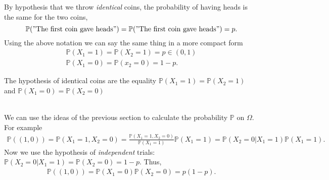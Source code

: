 \documentclass[12pt]{article}
\newcommand{\<}{{\langle \!\! \langle}}
\renewcommand{\>}{{\rangle \!\! \rangle}}
\newcommand{\bel}[2]{\begin{equation} \label{#1} \begin{split} #2
 					\end{split} \end{equation}}
\newcommand{\commento}[1]{
	\par\noindent
	\colorbox{light}{\begin{minipage}{120 mm}#1\end{minipage}}
	\par\noindent
}
\begin{document}
By hypothesis that we throw \emph{identical} coins, the probability of having heads is the same for the two coins, 
$$\mathbb{P}("\textrm{The first coin gave heads}")=\mathbb{P}("\textrm{The first coin gave heads}")=p.$$
Using the above notation we can say the same thing in a more compact form 
\bel{}{\mathbb{P}(X_1=1)=\mathbb{P}(X_2=1)=p\in(0,1)\\
\mathbb{P}(X_1=0)=\mathbb{P}(x_2=0)=1-p.}
\commento{The hypothesis of identical coins are the equality $\mathbb{P}(X_1=1)=\mathbb{P}(X_2=1)$ and $\mathbb{P}(X_1=0)=\mathbb{P}(X_2=0)$}\\
We can use the ideas of the previous section to calculate the probability $\mathbb{P}$ on $\Omega$. For example 
\bel{}{\mathbb{P}((1,0))=\mathbb{P}(X_1=1,X_2=0)=\frac{\mathbb{P}(X_1=1,X_2=0)}{\mathbb{P}(X_1=1)}\mathbb{P}(X_1=1)=\mathbb{P}(X_2=0|X_1=1)\mathbb{P}(X_1=1).}
Now we use the hypothesis of \emph{independent} trials: $\mathbb{P}(X_2=0|X_1=1)=\mathbb{P}(X_2=0)=1-p$. Thus,
\bel{}{\mathbb{P}((1,0))=\mathbb{P}(X_1=0)\mathbb{P}(X_2=0)=p(1-p).}
\end{document}
